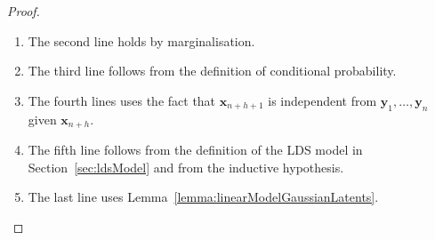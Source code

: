 \documentclass[12pt]{article}
\begin{document}
\begin{proof}
\begin{description}
\begin{enumerate}
                \item The second line holds by marginalisation.

                \item The third line follows from the definition of conditional
                    probability.

                \item The fourth lines uses the fact
                    that $\mathbf{x}_{n+h+1}$ is independent from
                    $\mathbf{y}_1,\ldots,\mathbf{y}_{n}$ given
                    $\mathbf{x}_{n+h}$.

                \item The fifth line follows from the definition of the LDS
                    model in Section~\ref{sec:ldsModel} and from the inductive
                    hypothesis.

                \item The last line uses
                    Lemma~\ref{lemma:linearModelGaussianLatents}.

            \end{enumerate}

    \end{description}

\end{proof}
\end{document}
